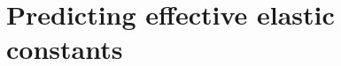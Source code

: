 \documentclass[amsmath,preprintnumbers,10pt,nofootinbib,prl,twocolumn]{revtex4-1}
\begin{document}

\section{Predicting effective elastic constants}
\end{document}
